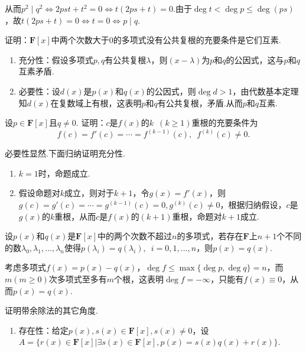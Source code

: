 \begin{exercise}
\begin{exgroup}
\begin{answer}
            从而$p^2\mid q^2\iff 2pst+t^2=0 \iff t(2ps+t)=0$.由于$\deg t<\deg p\le \deg (ps)$，故$t(2ps+t)=0\iff t=0 \iff p\mid q$.
        \end{answer}
        \item 证明：$\mathbf{F}[x]$中两个次数大于0的多项式没有公共复根的充要条件是它们互素.
        \begin{answer}
            \begin{enumerate}
                \item 充分性：假设多项式$p,q$有公共复根$\lambda$，则$(x-\lambda)$为$p$和$q$的公因式，这与$p$和$q$互素矛盾.
                \item 必要性：设$d(x)$是$p(x)$和$q(x)$的公因式，则$\deg d>1$，由代数基本定理知$d(x)$在复数域上有根，这表明$p$和$q$有公共复根，矛盾.从而$p$和$q$互素.
            \end{enumerate}
        \end{answer}
        \item 设$p\in\mathbf{F}[x]$且$q\neq 0$. 证明：$c$是$f(x)$的$k\enspace(k\geqslant 1)$重根的充要条件为
        \[f(c)=f'(c)=\cdots=f^{(k-1)}(c),\enspace f^{(k)}(c)\neq 0.\]
        \begin{answer}
            必要性显然.下面归纳证明充分性.
            \begin{enumerate}
                \item $k=1$时，命题成立.
                \item 假设命题对$k$成立，则对于$k+1$，令$g(x)=f'(x)$，则$g(c)=g'(c)=\cdots=g^{(k-1)}(c)=0,g^{(k)}(c)\neq 0$，根据归纳假设，$c$是$g(x)$的$k$重根，从而$c$是$f(x)$的$(k+1)$重根，命题对$k+1$成立.
            \end{enumerate}
        \end{answer}
        \item 设$p(x)$和$q(x)$是$\mathbf{F}[x]$中的两个次数不超过$n$的多项式，若存在$\mathbf{F}$上$n+1$个不同的数$\lambda_0,\lambda_1,\ldots,\lambda_n$使得$p(\lambda_i)=q(\lambda_i),\enspace i=0,1,\ldots,n$，则$p(x)=q(x)$.
        \begin{answer}
            考虑多项式$f(x)=p(x)-q(x)$，$\deg f\le \max\{\deg p,\deg q\}=n$，而$m(m\ge 0)$次多项式至多有$m$个根，这表明$\deg f=-\infty$，只能有$f(x)\equiv 0$，从而$p(x)=q(x)$.
        \end{answer}
    \end{exgroup}

    \begin{exgroup}
        \item 证明带余除法的其它角度.
        \begin{answer}
            \begin{enumerate}
                \item 存在性：给定$p(x),s(x)\in\mathbf{F}[x],s(x)\neq 0$，设$A=\{r(x)\in \mathbf{F}[x]|\exists s(x)\in \mathbf{F}[x],p(x)=s(x)q(x)+r(x)\}$.


\end{enumerate}
\end{answer}
\end{exgroup}
\end{exercise}
